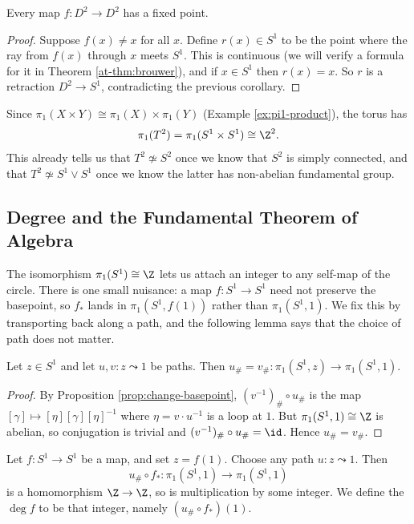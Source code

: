 \begin{corollary}[Brouwer Fixed Point Theorem, $n=2$]
	Every map $f: D^2 \to D^2$ has a fixed point.
\end{corollary}
\begin{proof}
	Suppose $f(x) \neq x$ for all $x$. Define $r(x) \in S^1$ to be the point where the ray from $f(x)$ through $x$ meets $S^1$. This is continuous (we will verify a formula for it in Theorem \ref{at-thm:brouwer}), and if $x \in S^1$ then $r(x) = x$. So $r$ is a retraction $D^2 \to S^1$, contradicting the previous corollary.
\end{proof}

\begin{example} \label{ex:pi1-torus}
	Since $\pi_1(X \times Y) \cong \pi_1(X) \times \pi_1(Y)$ (Example \ref{ex:pi1-product}), the torus has
	$$
	\pi_1(T^2) = \pi_1(S^1 \times S^1) \cong \Z^2 .
	$$
	This already tells us that $T^2 \not\simeq S^2$ once we know that $S^2$ is simply connected, and that $T^2 \not\simeq S^1 \vee S^1$ once we know the latter has non-abelian fundamental group.
\end{example}

\subsection{Degree and the Fundamental Theorem of Algebra}

The isomorphism $\pi_1(S^1) \cong \Z$ lets us attach an integer to any self-map of the
circle. There is one small nuisance: a map $f: S^1 \to S^1$ need not preserve the
basepoint, so $f_*$ lands in $\pi_1(S^1, f(1))$ rather than $\pi_1(S^1, 1)$. We fix this
by transporting back along a path, and the following lemma says that the choice of path
does not matter.

\begin{lemma} \label{lem:degree-welldefined}
	Let $z \in S^1$ and let $u, v: z \leadsto 1$ be paths. Then $u_\# = v_\#: \pi_1(S^1, z) \to \pi_1(S^1, 1)$.
\end{lemma}
\begin{proof}
	By Proposition \ref{prop:change-basepoint}, $(v^{-1})_\# \circ u_\#$ is the map $[\gamma] \mapsto [\eta][\gamma][\eta]^{-1}$ where $\eta = v \cdot u^{-1}$ is a loop at $1$. But $\pi_1(S^1, 1) \cong \Z$ is abelian, so conjugation is trivial and $(v^{-1})_\# \circ u_\# = \id$. Hence $u_\# = v_\#$.
\end{proof}

\begin{definition}[Degree]
	Let $f: S^1 \to S^1$ be a map, and set $z = f(1)$. Choose any path $u: z \leadsto 1$. Then
	$$
	u_\# \circ f_*: \pi_1(S^1,1) \to \pi_1(S^1,1)
	$$
	is a homomorphism $\Z \to \Z$, so is multiplication by some integer. We define the  $\deg f$ to be that integer, namely $(u_\# \circ f_*)(1)$.
\end{definition}

